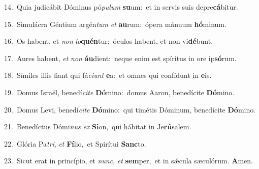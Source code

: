{\numbfont\textcolor{\numbcolor}{14.}}~Quia judicábit Dóminus pó\-\textit{pu}\-\textit{lum} \textbf{su}\-um:~\star et in servis suis depre\-\textbf{cá}\-bitur.\par
{\numbfont\textcolor{\numbcolor}{15.}}~Simulácra Géntium argén\textit{tum} \textit{et} \textbf{au}\-rum:~\star ópera mánuum \textbf{hó}\-minum.\par
{\numbfont\textcolor{\numbcolor}{16.}}~Os habent, et \textit{non} \textit{lo}\-\textbf{quén}tur:~\star óculos habent, et non vi\-\textbf{dé}\-bunt.\par
{\numbfont\textcolor{\numbcolor}{17.}}~Aures habent, \textit{et} \textit{non} \textbf{áu}\-dient:~\star neque enim est spíritus in ore ip\-\textbf{só}\-rum.\par
{\numbfont\textcolor{\numbcolor}{18.}}~Símiles illis fiant qui fá\-\textit{ci}\-\textit{unt} \textbf{e}\-a:~\star et omnes qui confídunt in \textbf{e}\-is.\par
{\numbfont\textcolor{\numbcolor}{19.}}~Domus Israël, benedí\-\textit{ci}\-\textit{te} \textbf{Dó}\-mino:~\star domus Aaron, benedícite \textbf{Dó}\-mino.\par
{\numbfont\textcolor{\numbcolor}{20.}}~Domus Levi, benedí\-\textit{ci}\-\textit{te} \textbf{Dó}\-mino:~\star qui timétis Dóminum, benedícite \textbf{Dó}\-mino.\par
{\numbfont\textcolor{\numbcolor}{21.}}~Benedíctus Dómi\textit{nus} \textit{ex} \textbf{Si}\-on,~\star qui hábitat in Je\-\textbf{rú}\-salem.\par
{\numbfont\textcolor{\numbcolor}{22.}}~Glória Pa\-\textit{tri}\-, \textit{et} \textbf{Fí}\-lio,~\star et Spirítui \textbf{Sanc}\-to.\par
{\numbfont\textcolor{\numbcolor}{23.}}~Sicut erat in princípio, et \textit{nunc}\-, \textit{et} \textbf{sem}\-per,~\star et in sǽcula sæculórum. \textbf{A}\-men.\par
